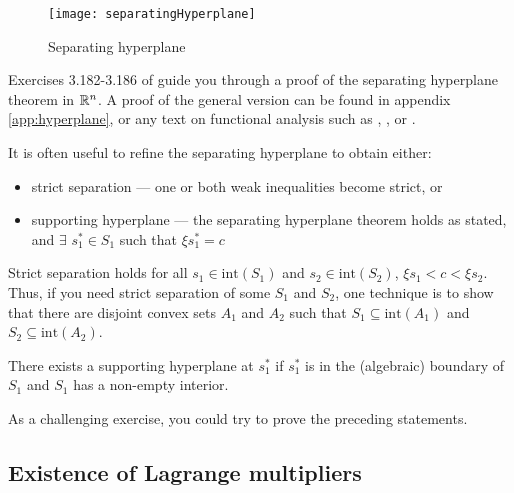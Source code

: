 \begin{figure}\caption{Separating hyperplane \label{fig:sht}}
  \begin{centering}
    \texttt{[image: separatingHyperplane]}
  \end{centering}
\end{figure}

Exercises 3.182-3.186 of \cite{carter2001} guide you through a proof
of the separating hyperplane theorem in $\mathbb{R}^n$. A proof of the general
version can be found in appendix \ref{app:hyperplane}, or any text on
functional analysis such as \cite{luenberger1969}, \cite{clarke2013},
or \cite{holmes1975}. 

\begin{remark}
  It is often useful to refine the separating hyperplane to obtain
  either:
  \begin{itemize}
  \item strict separation --- one or both weak inequalities become
    strict, or 
  \item supporting hyperplane --- the separating hyperplane theorem
    holds as stated, and $\exists$ $s^*_1 \in S_1$ such that $\xi
    s^*_1 = c$
  \end{itemize}
  Strict separation holds for all $s_1 \in \mathrm{int}(S_1)$ and $s_2
  \in \mathrm{int}(S_2)$, $\xi s_1 < c < \xi s_2$. Thus, if you need
  strict separation of some $S_1$ and $S_2$, one technique is to show
  that there are disjoint convex sets $A_1$ and $A_2$ such that $S_1
  \subseteq \mathrm{int}(A_1)$ and $S_2 \subseteq \mathrm{int}(A_2)$.

  There exists a supporting hyperplane at $s_1^*$ if $s_1^*$ is in the
  (algebraic) boundary of $S_1$ and $S_1$ has a non-empty interior.

  As a challenging exercise, you could try to prove the preceding
  statements. 
\end{remark}

\subsection{Existence of Lagrange multipliers}

